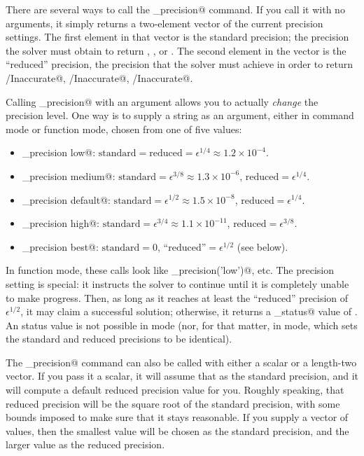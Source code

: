\documentclass[12pt]{article}
\begin{document}
There are several ways to call the \verb@cvx_precision@ command. If you call it with no arguments,
it simply returns a two-element vector of the current precision settings. The first element
in that vector is the standard precision; the precision the solver must obtain to return
\verb@Solved@, \verb@Unbounded@, or \verb@Infeasible@. The second element in the vector is
the ``reduced'' precision, the precision that the solver must achieve in order to
return \verb@Solved/Inaccurate@, \verb@Unbounded/Inaccurate@, \verb@Infeasible/Inaccurate@.

Calling \verb@cvx_precision@ with an argument allows you to actually \emph{change} the
precision level. One way is to supply a string as an argument, either in command mode
or function mode, chosen from one of five values:
\begin{itemize}
	\item \verb@cvx_precision low@:      $\text{standard} = \text{reduced} = \epsilon^{1/4} \approx 1.2\times10^{-4}$.
	\item \verb@cvx_precision medium@:   $\text{standard} = \epsilon^{3/8} \approx 1.3\times10^{-6}$, $\text{reduced} = \epsilon^{1/4}$.
	\item \verb@cvx_precision default@:  $\text{standard} = \epsilon^{1/2} \approx 1.5\times10^{-8}$, $\text{reduced} = \epsilon^{1/4}$.
	\item \verb@cvx_precision high@:     $\text{standard} = \epsilon^{3/4} \approx 1.1\times10^{-11}$, $\text{reduced} = \epsilon^{3/8}$.
	\item \verb@cvx_precision best@:     $\text{standard} = 0$, $\text{``reduced''} = \epsilon^{1/2}$  (see below).
\end{itemize}
In function mode, these calls look like \verb@cvx_precision('low')@, etc.
The \verb@best@ precision setting is special: it instructs the solver to continue until it is
completely unable to make progress. Then, as long as it reaches at least the ``reduced'' precision
of $\epsilon^{1/2}$, it may claim a successful solution; otherwise,
it returns a \verb@cvx_status@ value of \verb@Failed@. An \verb@Inaccurate@ status value is 
not possible in \verb@best@ mode (nor, for that matter, in \verb@low@ mode, which
sets the standard and reduced precisions to be identical).

The \verb@cvx_precision@ command can also be called with either a scalar or a
length-two vector. If you pass it a scalar, it will assume that as the standard
precision, and it will compute a default reduced precision value for you.
Roughly speaking, that reduced precision will be the square root of the standard
precision, with some bounds imposed to make sure that it stays reasonable. If
you supply a vector of values, then the smallest value will be chosen as
the standard precision, and the larger value as the reduced precision.
\end{document}
